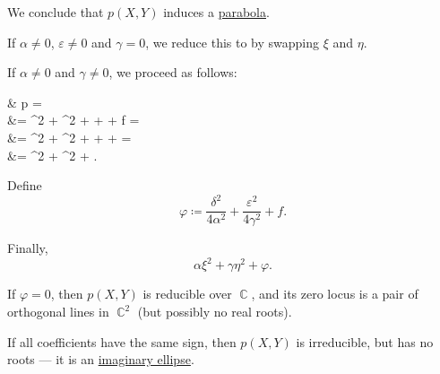 \begin{algorithm}
\begin{thmenum}
    We conclude that \( p(X, Y) \) induces a \hyperref[def:parabola]{parabola}.

     If \( \alpha \neq 0 \), \( \varepsilon \neq 0 \) and \( \gamma = 0 \), we reduce this to  by swapping \( \xi \) and \( \eta \).

     If \( \alpha \neq 0 \) and \( \gamma \neq 0 \), we proceed as follows:
    \begin{balign*}
      &\phantom{{}={}}
      p\parens*{ \xi - \frac \delta {2 \alpha}, \eta - \frac \varepsilon {2 \gamma} }
      = \\ &=
      \alpha \parens*{ \xi - \frac \delta {2 \alpha} }^2 + \gamma \parens*{ \eta - \frac \varepsilon {2 \gamma} }^2 + \delta \parens*{ \xi - \frac \delta {2 \alpha} } + \varepsilon \parens*{ \eta - \frac \varepsilon {2 \gamma} } + f
      = \\ &=
      \alpha \xi^2 + \gamma \eta^2 + \parens[\Big]{ 2 \alpha \cdot \frac {-\delta} {2 \alpha} + \delta } \xi + \parens[\Big]{ 2 \gamma \cdot \frac {-\varepsilon} {2 \gamma} + \varepsilon } \eta + 
      = \\ &=
      \alpha \xi^2 + \gamma \eta^2 + .
    \end{balign*}

    Define
    \begin{equation*}
      \varphi \coloneqq \frac {\delta^2} {4 \alpha^2} + \frac {\varepsilon^2} {4 \gamma^2} + f.
    \end{equation*}

    Finally,
    \begin{equation*}
      \alpha \xi^2 + \gamma \eta^2 + \varphi.
    \end{equation*}

    \begin{thmenum}
       If \( \varphi = 0 \), then \( p(X, Y) \) is reducible over \( \BbbC \), and its zero locus is a pair of orthogonal lines in \( \BbbC^2 \) (but possibly no real roots).

       If all coefficients have the same sign, then \( p(X, Y) \) is irreducible, but has no roots --- it is an \hyperref[ex:imaginary_ellipse]{imaginary ellipse}.


\end{thmenum}
\end{thmenum}
\end{algorithm}
